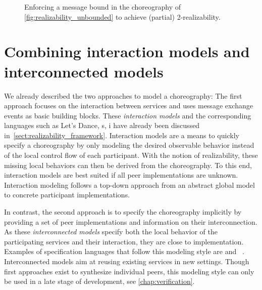 \begin{figure}
\centering
{}
\caption{Enforcing a message bound in the choreography of \autoref{fig:realizability_unbounded} to achieve (partial) 2-realizability.}
\label{fig:realizability_bounded}
\end{figure}





\section{Combining interaction models and interconnected models}
\label{sect:realizability_application}

We already described the two approaches to model a choreography: The first approach focuses on the interaction between services and uses message exchange events as basic building blocks. These \emph{interaction models} and the corresponding languages such as Let's Dance, s, i have already been discussed in~\autoref{sect:realizability_framework}. Interaction models are a means to quickly specify a choreography by only modeling the desired observable behavior instead of the local control flow of each participant. With the notion of realizability, these missing local behaviors can then be derived from the choreography. To this end, interaction models are best suited if all peer implementations are unknown. Interaction modeling follows a top-down approach from an abstract global model to concrete participant implementations.

In contrast, the second approach is to specify the choreography implicitly by providing a set of peer implementations and information on their interconnection. As these \emph{interconnected models} specify both the local behavior of the participating services and their interaction, they are close to implementation. Examples of specification languages that follow this modeling style are  and \bpelchor~\cite{DeckerKLW_2007_icws}. Interconnected models aim at reusing existing services in new settings. Though first approaches exist to synthesize individual peers, this modeling style can only be used in a late stage of development, see \autoref{chap:verification}.

